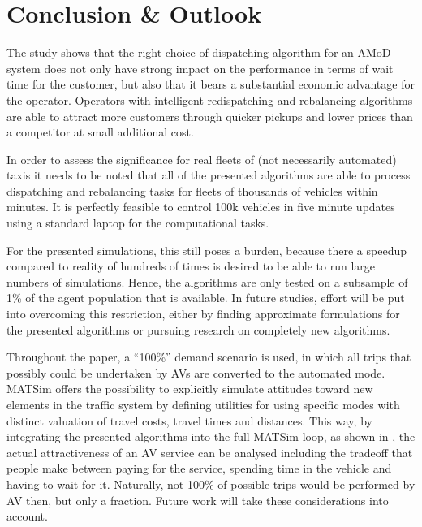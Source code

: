 \section{Conclusion \& Outlook}
\label{sec:Conclusion}

The study shows that the right choice of dispatching algorithm for an AMoD system
does not only have strong impact on the performance in terms of wait time for
the customer, but also that it bears a substantial economic advantage for the
operator. Operators with intelligent redispatching and rebalancing algorithms are able to attract
more customers through quicker pickups and lower prices than a competitor at small additional cost.

In order to assess the significance for real fleets of (not necessarily
automated) taxis it needs to be noted that all of the presented algorithms are
able to process dispatching and rebalancing tasks for fleets of thousands of
vehicles within minutes. It is perfectly feasible to control 100k vehicles in
five minute updates using a standard laptop for the computational tasks.

For the presented simulations, this still poses a burden, because there
a speedup compared to reality of hundreds of times is desired to be able
to run large numbers of simulations. Hence, the algorithms
are only tested on a subsample of 1\% of the agent population that is available.
In future studies, effort will be put into overcoming this restriction, either
by finding approximate formulations for the presented algorithms or pursuing research
on completely new algorithms.

Throughout the paper, a ``100\%'' demand scenario is used, in which all
trips that possibly could be undertaken by AVs are converted to the automated
mode. MATSim offers the possibility to explicitly
simulate attitudes toward new elements in the traffic system by defining utilities
for using specific modes with distinct valuation of travel costs, travel times and
distances. This way, by integrating the presented algorithms into the full
MATSim loop, as shown in \cite{horl_abmtrans17}, the actual attractiveness of an
AV service can be analysed including the tradeoff that people make between
paying for the service, spending time in the vehicle and having to wait for it.
Naturally, not 100\% of possible trips would be performed by AV then, but only
a fraction. Future work will take these considerations into account.
